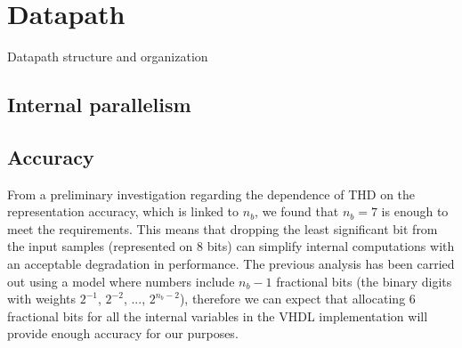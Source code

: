 \section{Datapath}
Datapath structure and organization

\subsection{Internal parallelism}
\subsection{Accuracy}
From a preliminary investigation regarding the dependence of THD on the representation accuracy, which is linked to $n_b$, we found that $n_b=7$ is enough to meet the requirements. This means that dropping the least significant bit from the input samples (represented on 8 bits) can simplify internal computations with an acceptable degradation in performance. The previous analysis has been carried out using a model where numbers include $n_b-1$ fractional bits (the binary digits with weights $2^{-1}$, $2^{-2}$, ..., $2^{n_b-2}$), therefore we can expect that allocating 6 fractional bits for all the internal variables in the VHDL implementation will provide enough accuracy for our purposes.

